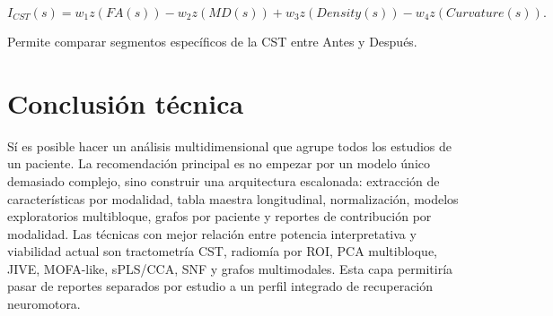 \documentclass[conference]{IEEEtran}
\begin{document}
\begin{equation}
I_{CST}(s)= w_1 z(FA(s)) - w_2 z(MD(s)) + w_3 z(Density(s)) - w_4 z(Curvature(s)).
\end{equation}

Permite comparar segmentos específicos de la CST entre Antes y Después.

\section{Conclusión técnica}
Sí es posible hacer un análisis multidimensional que agrupe todos los estudios de un paciente. La recomendación principal es no empezar por un modelo único demasiado complejo, sino construir una arquitectura escalonada: extracción de características por modalidad, tabla maestra longitudinal, normalización, modelos exploratorios multibloque, grafos por paciente y reportes de contribución por modalidad. Las técnicas con mejor relación entre potencia interpretativa y viabilidad actual son tractometría CST, radiomía por ROI, PCA multibloque, JIVE, MOFA-like, sPLS/CCA, SNF y grafos multimodales. Esta capa permitiría pasar de reportes separados por estudio a un perfil integrado de recuperación neuromotora.



\end{document}
